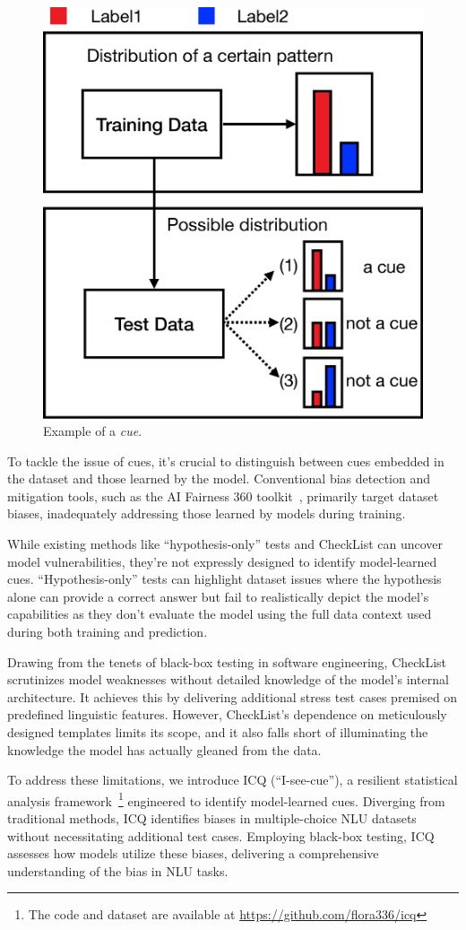 \begin{figure}[th]
\centering
\includegraphics[width=0.70\columnwidth]{picture/cue_def.eps}
\caption{Example of a {\em cue}. }
\label{fig:cue_def}
\end{figure}

To tackle the issue of cues, it's crucial to distinguish between cues embedded 
in the dataset and those learned by the model. 
Conventional bias detection and mitigation tools, 
such as the AI Fairness 360 toolkit~\cite{bellamy2018ai}, 
primarily target dataset biases, 
inadequately addressing those learned by models during training.

While existing methods like ``hypothesis-only'' tests and 
CheckList can uncover model vulnerabilities, 
they're not expressly designed to identify model-learned cues. 
``Hypothesis-only'' tests can highlight dataset issues where 
the hypothesis alone can provide a correct answer 
but fail to realistically depict the model's capabilities as they 
don't evaluate the model using the full data context 
used during both training and prediction.

Drawing from the tenets of black-box testing in software engineering, 
CheckList scrutinizes model weaknesses without detailed knowledge of 
the model's internal architecture. It achieves this by delivering 
additional stress test cases premised on predefined linguistic features. 
However, CheckList's dependence on meticulously designed templates 
limits its scope, and it also falls short of 
illuminating the knowledge the model has actually gleaned from the data.

To address these limitations, we introduce ICQ (``I-see-cue''), 
a resilient statistical analysis framework~\footnote{The code and dataset are
available at \url{https://github.com/flora336/icq}}
engineered to identify model-learned cues. 
Diverging from traditional methods, 
ICQ identifies biases in multiple-choice NLU datasets without necessitating additional 
test cases. Employing black-box testing, ICQ assesses how models utilize 
these biases, delivering a comprehensive understanding of the bias in NLU tasks.

